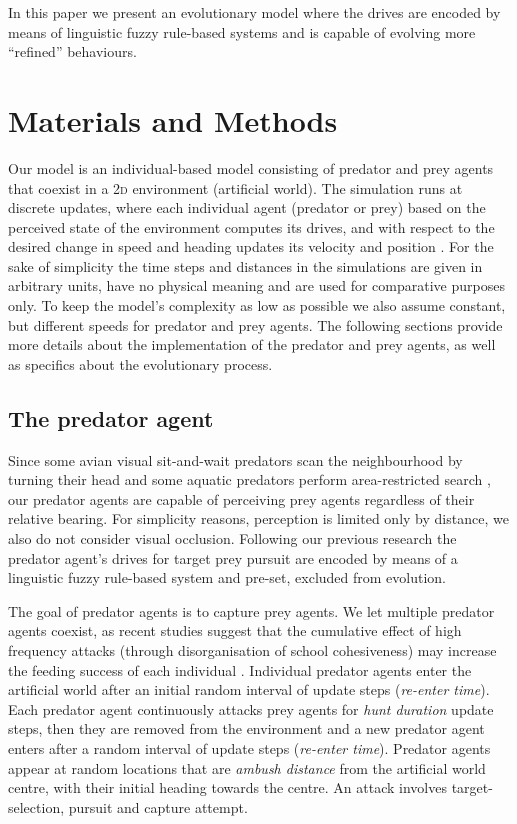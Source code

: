 In this paper we present an evolutionary model where the drives are encoded by means of linguistic fuzzy rule-based systems and is capable of evolving more ``refined'' behaviours.

\section{Materials and Methods}

Our model is an individual-based model consisting of predator and prey agents that coexist in a \textsc{2d} environment (artificial world). The simulation runs at discrete updates, where each individual agent (predator or prey) based on the perceived state of the environment computes its drives, and with respect to the desired change in speed and heading updates its velocity and position \cite{lebarbajec2005fuzzy,lebarbajec2005simulating}. For the sake of simplicity the time steps and distances in the simulations are given in arbitrary units, have no physical meaning and are used for comparative purposes only. To keep the model's complexity as low as possible we also assume constant, but different speeds for predator and prey agents. The following sections provide more details about the implementation of the predator and prey agents, as well as specifics about the evolutionary process.

\subsection{The predator agent}

Since some avian visual sit-and-wait predators scan the neighbourhood by turning their head \cite{gall2010visual,orourke2010hawkeyes2} and some aquatic predators perform area-restricted search \cite{thums2011insitu}, our predator agents are capable of perceiving prey agents regardless of their relative bearing. For simplicity reasons, perception is limited only by distance, \ie we also do not consider visual occlusion. Following our previous research \cite{demsar2014simulated} the predator agent's drives for target prey pursuit are encoded by means of a linguistic fuzzy rule-based system and pre-set, \ie excluded from evolution.

The goal of predator agents is to capture prey agents. We let multiple predator agents coexist, as recent studies suggest that the cumulative effect of high frequency attacks (through disorganisation of school cohesiveness) may increase the feeding success of each individual \cite{lett2014effects,thiebault2015howto}. Individual predator agents enter the artificial world after an initial random interval of update steps (\emph{re-enter time}). Each predator agent continuously attacks prey agents for \emph{hunt duration} update steps, then they are removed from the environment and a new predator agent enters after a random interval of update steps (\emph{re-enter time}). Predator agents appear at random locations that are \emph{ambush distance} from the artificial world centre, with their initial heading towards the centre. An attack involves target-selection, pursuit and capture attempt.


